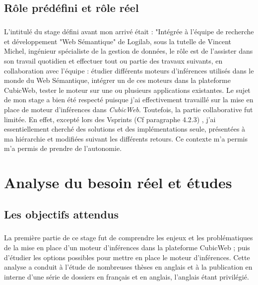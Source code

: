 \documentclass {report}
\begin{document}

\section{Rôle prédéfini et rôle réel}
\paragraph{}
L'intitulé du stage défini avant mon arrivé était : "Intégrée à l'équipe de recherche et développement "Web Sémantique" de Logilab, sous la tutelle de Vincent Michel, ingénieur spécialiste de la gestion de données, le rôle est de l'assister dans son travail quotidien et effectuer tout ou partie des travaux suivants, en collaboration avec l'équipe : étudier différents moteurs d'inférences utilisés dans le monde du Web Sémantique, intégrer un de ces moteurs dans la plateforme CubicWeb, tester le moteur sur une ou plusieurs applications existantes. Le sujet de mon stage a bien été respecté puisque j'ai effectivement travaillé sur la mise en place de moteur d'inférences dans \textit{CubicWeb}. Toutefois, la partie collaborative fut limitée. En effet, excepté lors des Vsprints (Cf paragraphe 4.2.3) , j'ai essentiellement cherché des solutions et des implémentations seule, présentées à ma hiérarchie et modifiées suivant les différents retours. Ce contexte m'a permis m'a permis de prendre de l'autonomie.


\chapter{Analyse du besoin réel et études}
\section{Les objectifs attendus}
\paragraph{}
La première partie de ce stage fut de comprendre les enjeux et les problématiques de la mise en place d'un moteur d'inférences dans la plateforme CubicWeb ; puis d'étudier les options possibles pour mettre en place le moteur d'inférences. Cette analyse a conduit à l'étude de nombreuses thèses en anglais et à la publication en interne d'une série de dossiers en français et en anglais, l'anglais étant privilégié.
\end{document}
